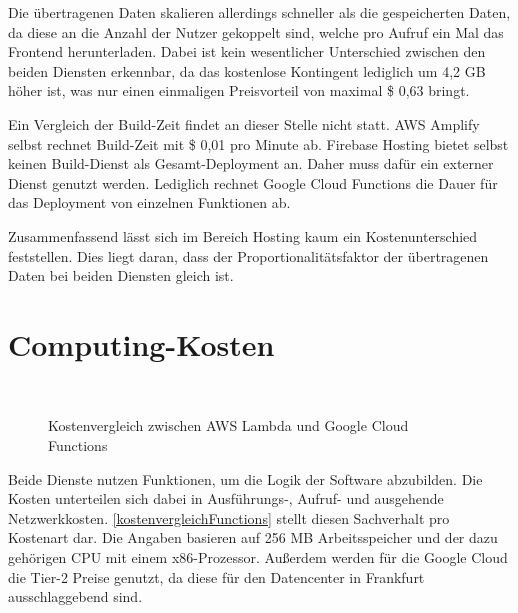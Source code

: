 Die übertragenen Daten skalieren allerdings schneller als die gespeicherten Daten, da diese an die Anzahl der Nutzer gekoppelt sind, welche pro Aufruf ein Mal das Frontend herunterladen. Dabei ist kein wesentlicher Unterschied zwischen den beiden Diensten erkennbar, da das kostenlose Kontingent lediglich um 4,2 GB höher ist, was nur einen einmaligen Preisvorteil von maximal \$ 0,63 bringt.

Ein Vergleich der Build-Zeit findet an dieser Stelle nicht statt. \ac{AWS} Amplify selbst rechnet Build-Zeit mit \$ 0,01 pro Minute ab. Firebase Hosting bietet selbst keinen Build-Dienst als Gesamt-Deployment an. Daher muss dafür ein externer Dienst genutzt werden. Lediglich rechnet Google Cloud Functions die Dauer für das Deployment von einzelnen Funktionen ab.

Zusammenfassend lässt sich im Bereich Hosting kaum ein Kostenunterschied feststellen. Dies liegt daran, dass der  Proportionalitätsfaktor der übertragenen Daten bei beiden Diensten gleich ist.

\section{Computing-Kosten}

\begin{figure}
  \centering
  \quad
  \\
  \quad
  \caption{Kostenvergleich zwischen AWS Lambda und Google Cloud Functions}
  \label{kostenvergleichFunctions}
\end{figure}

Beide Dienste nutzen Funktionen, um die Logik der Software abzubilden. Die Kosten unterteilen sich dabei in Ausführungs-, Aufruf- und ausgehende Netzwerkkosten. \autoref{kostenvergleichFunctions} stellt diesen Sachverhalt pro Kostenart dar. Die Angaben basieren auf 256 MB Arbeitsspeicher und der dazu gehörigen CPU mit einem x86-Prozessor. Außerdem werden für die Google Cloud die Tier-2 Preise genutzt, da diese für den Datencenter in Frankfurt ausschlaggebend sind.

